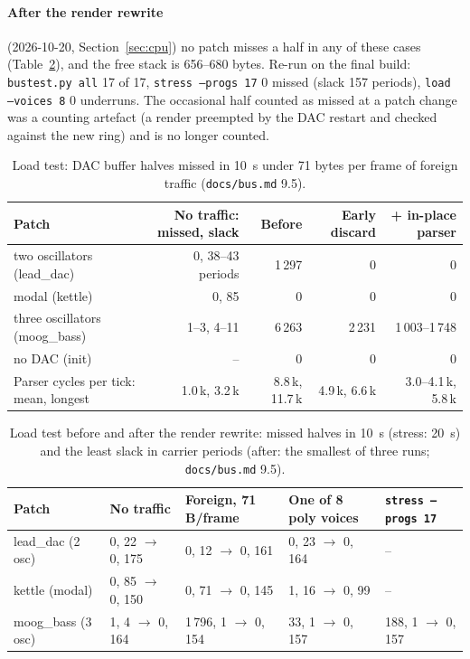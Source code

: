 \documentclass[11pt,a4paper]{article}
\newcommand{\file}[1]{\texttt{#1}}
\begin{document}
\paragraph{After the render rewrite} (2026-10-20, Section~\ref{sec:cpu}) no patch misses a half in any of these cases
(Table~\ref{tab:loadrw}), and the free stack is 656--680 bytes. Re-run on the final build: \texttt{bustest.py all}
17 of 17, \texttt{stress --progs 17} 0 missed (slack 157 periods), \texttt{load --voices 8} 0 underruns. The occasional
half counted as missed at a patch change was a counting artefact (a render preempted by the DAC restart and checked
against the new ring) and is no longer counted.

\begin{table}[htbp]
\centering\small
\caption{Load test: DAC buffer halves missed in \SI{10}{s} under 71 bytes per frame of foreign traffic (\file{docs/bus.md}
9.5).}\label{tab:loadcard}
\setlength{\tabcolsep}{4pt}
\begin{tabularx}{\textwidth}{@{}X r r r r@{}}
\toprule
Patch & No traffic: missed, slack & Before & Early discard & + in-place parser \\
\midrule
two oscillators (lead\_dac) & 0, 38--43 periods & 1\,297 & 0 & 0 \\
modal (kettle) & 0, 85 & 0 & 0 & 0 \\
three oscillators (moog\_bass) & 1--3, 4--11 & 6\,263 & 2\,231 & 1\,003--1\,748 \\
no DAC (init) & -- & 0 & 0 & 0 \\
Parser cycles per tick: mean, longest & 1.0\,k, 3.2\,k & 8.8\,k, 11.7\,k & 4.9\,k, 6.6\,k & 3.0--4.1\,k, 5.8\,k \\
\bottomrule
\end{tabularx}
\end{table}

\begin{table}[htbp]
\centering\small
\caption{Load test before and after the render rewrite: missed halves in \SI{10}{s} (stress: \SI{20}{s}) and the
least slack in carrier periods (after: the smallest of three runs; \file{docs/bus.md} 9.5).}\label{tab:loadrw}
\setlength{\tabcolsep}{4pt}
\begin{tabularx}{\textwidth}{@{}X l l l l@{}}
\toprule
Patch & No traffic & Foreign, 71\,B/frame & One of 8 poly voices & \texttt{stress --progs 17} \\
\midrule
lead\_dac (2 osc) & 0, 22 $\to$ 0, 175 & 0, 12 $\to$ 0, 161 & 0, 23 $\to$ 0, 164 & -- \\
kettle (modal) & 0, 85 $\to$ 0, 150 & 0, 71 $\to$ 0, 145 & 1, 16 $\to$ 0, 99 & -- \\
moog\_bass (3 osc) & 1, 4 $\to$ 0, 164 & 1\,796, 1 $\to$ 0, 154 & 33, 1 $\to$ 0, 157 & 188, 1 $\to$ 0, 157 \\
\bottomrule
\end{tabularx}
\end{table}
\end{document}

